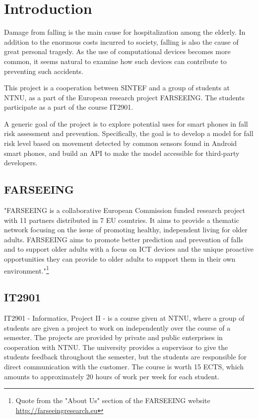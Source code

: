 \chapter{Introduction}

Damage from falling is the main cause for hospitalization among the elderly. In addition to the enormous costs incurred to society, falling is also the cause of great personal tragedy. As the use of computational devices becomes more common, it seems natural to examine how such devices can contribute to preventing such accidents.

This project is a cooperation between SINTEF and a group of students at NTNU, as a part of the European research project FARSEEING. The students participate as a part of the course IT2901.

A generic goal of the project is to explore potential uses for smart phones in fall risk assessment and prevention. Specifically, the goal is to develop a model for fall risk level based on movement detected by common sensors found in Android smart phones, and build an API to make the model accessible for third-party developers.

\section{FARSEEING}
"FARSEEING is a collaborative European Commission funded research project with 11 partners distributed in 7 EU countries. It aims to provide a thematic network focusing on the issue of promoting healthy, independent living for older adults. FARSEEING aims to promote better prediction and prevention of falls and to support older adults with a focus on ICT devices and the unique proactive opportunities they can provide to older adults to support them in their own environment."\footnote{Quote from the "About Us" section of the FARSEEING website \url{http://farseeingresearch.eu}}

\section{IT2901}
IT2901 - Informatics, Project II - is a course given at NTNU, where a group of students are given a project to work on independently over the course of a semester. The projects are provided by private and public enterprises in cooperation with NTNU. The university provides a supervisor to give the students feedback throughout the semester, but the students are responsible for direct communication with the customer. The course is worth 15 ECTS, which amounts to approximately 20 hours of work per week for each student. 


